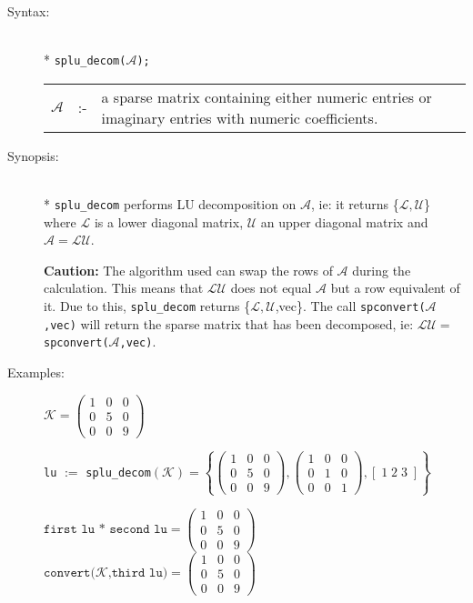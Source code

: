 \begin{description}
\item[Syntax:]\mbox{}\\*
\texttt{splu\_decom($\mathcal{A}$);}\\[2mm]
\begin{tabular}{l l p{.848\linewidth}}
$\mathcal{A}$ &:-& a sparse matrix containing either
numeric entries or imaginary entries with numeric coefficients.
\end{tabular}

\item[Synopsis:]\mbox{}\\*
              \texttt{splu\_decom} performs LU decomposition on $\mathcal{A}$,
              ie: it returns \{$\mathcal{L,U}$\} where $\mathcal{L}$
              is a lower diagonal matrix, $\mathcal{U}$ an upper diagonal
              matrix and $\mathcal{A} = \mathcal{LU}$.

\textbf{Caution:}
The algorithm used can swap the rows of $\mathcal{A}$
                during the calculation. This means that $\mathcal{LU}$ does
                not equal $\mathcal{A}$ but a row equivalent of it. Due to
                this, \texttt{splu\_decom} returns \{$\mathcal{L,U}$,vec\}. The
                call \texttt{spconvert($\mathcal{A}$,vec)} will return the
                sparse matrix that has been decomposed, ie: $\mathcal{LU} = $
                \texttt{spconvert($\mathcal{A}$,vec)}.

\item[Examples:]
\begin{flushleft}
\(
\mathcal{K} = \begin{pmatrix} 1 & 0 & 0 \\ 0 & 5 & 0 \\ 0 & 0 & 9 \end{pmatrix}
\)
\end{flushleft}

\texttt{lu} $:=$ \texttt{splu\_decom}\((\mathcal{K}) =
\left\{
        \begin{pmatrix} 1 & 0 & 0 \\ 0 & 5 & 0 \\ 0 & 0 & 9 \end{pmatrix},
        \begin{pmatrix} 1 & 0 & 0 \\ 0 & 1 & 0 \\ 0 & 0 & 1 \end{pmatrix},
	[\; 1 \; 2 \; 3 \; ]
\right\}
\)

\(\texttt{first lu * second lu} =
        \begin{pmatrix} 1 & 0 & 0 \\ 0 & 5 & 0 \\ 0 & 0 & 9 \end{pmatrix}\) \\[2mm]
\(\texttt{convert($\mathcal{K}$,third lu}) =
        \begin{pmatrix} 1 & 0 & 0 \\ 0 & 5 & 0 \\ 0 & 0 & 9 \end{pmatrix}\)


\end{description}
